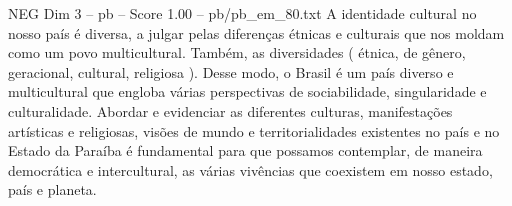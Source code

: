 \begin{textsample}{NEG Dim 3 – pb – Score 1.00 – pb/pb\_em\_80.txt}
A identidade cultural no nosso país é diversa, a julgar pelas diferenças étnicas e culturais que nos moldam como um povo multicultural.
Também, as diversidades ( étnica, de gênero, geracional, cultural, religiosa ).
Desse modo, o Brasil é um país diverso e multicultural que engloba várias perspectivas de sociabilidade, singularidade e culturalidade.
Abordar e evidenciar as diferentes culturas, manifestações artísticas e religiosas, visões de mundo e territorialidades existentes no país e no Estado da Paraíba é fundamental para que possamos contemplar, de maneira democrática e intercultural, as várias vivências que coexistem em nosso estado, país e planeta.

\end{textsample}
